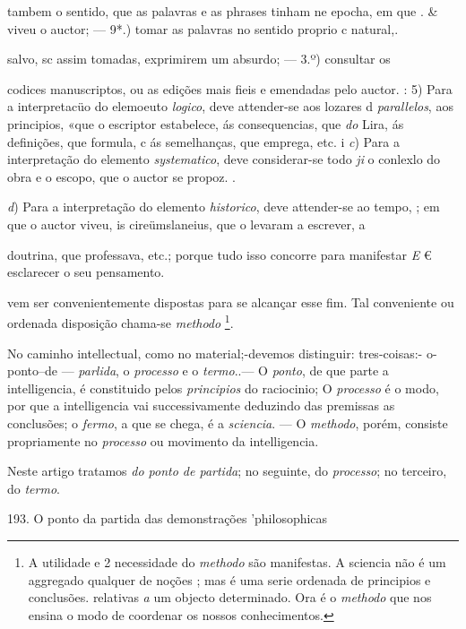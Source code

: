 tambem o sentido, que as palavras e as phrases tinham ne epocha, em que . \& viveu o auctor; --- 9*.) tomar as palavras no sentido proprio c natural,.

salvo, sc assim tomadas, exprimirem um absurdo; --- 3.º) consultar os

codices manuscriptos, ou as edições mais fieis e emendadas pelo auctor. : 5) Para a interpretacüo do elemoeuto \emph{logico}, deve attender-se aos lozares d \emph{parallelos}, aos principios, «que o escriptor estabelece, ás consequencias, que \emph{do} Lira, ás definições, que formula, c ás semelhanças, que emprega, etc. i \emph{c}) Para a interpretação do elemento \emph{systematico}, deve considerar-se todo \emph{ji} o conlexlo do obra e o escopo, que o auctor se propoz. .

\emph{d}) Para a interpretação do elemento \emph{historico}, deve attender-se ao tempo, ; em que o auctor viveu, is cireümslaneius, que o levaram a escrever, a

doutrina, que professava, etc.; porque tudo isso concorre para manifestar \emph{E} € esclarecer o seu pensamento.

vem ser convenientemente dispostas para se alcançar esse fim. Tal conveniente ou ordenada disposição chama-se \emph{methodo} \footnote{A utilidade e 2 necessidade do \emph{methodo} são manifestas. A sciencia não é um aggregado qualquer de noções ; mas é uma serie ordenada de principios e conclusões. relativas \emph{a} um objecto determinado. Ora é o \emph{methodo} que nos ensina o modo de coordenar os nossos conhecimentos.}.


 
No caminho intellectual, como no material;-devemos distinguir: tres-coisas:- o-ponto--de --- \emph{parlida}, o \emph{processo} e o \emph{termo}..--- O \emph{ponto}, de que parte a intelligencia, é constituido pelos \emph{principios} do raciocinio; O \emph{processo} é o modo, por que a intelligencia vai successivamente deduzindo das premissas as conclusões; o \emph{fermo}, a que se chega, é a \emph{sciencia}. --- O \emph{methodo}, porém, consiste propriamente no \emph{processo} ou movimento da intelligencia. \textbar{}

Neste artigo tratamos \emph{do ponto de partida}; no seguinte, do \emph{processo}; no terceiro, do \emph{termo}.

193. O ponto da partida das demonstrações 'philosophicas

